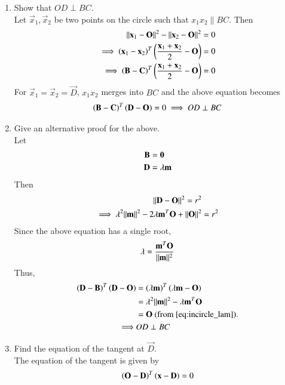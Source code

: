 \begin{enumerate}[label=\arabic*.,ref=\thesubsection.\theenumi]
\item Show that $OD \perp BC$.
%
\\
\solution Let $\vec{x}_1,\vec{x}_2$ be two points on the circle such that 
$x_1x_2 \parallel BC$. Then
%
\begin{align}
\lVert\mathbf{x}_1-\mathbf{O}\rVert^2- 
\lVert\mathbf{x}_2-\mathbf{O}\rVert^2 &= 0 
\\
\implies 
\left(\mathbf{x}_1-\mathbf{x}_2\right)^T\left(\frac{\mathbf{x}_1+\mathbf{x}_2}{2}-\mathbf{O}\right) &= 
0 
\\
\implies 
\left(\mathbf{B}-\mathbf{C}\right)^T\left(\frac{\mathbf{x}_1+\mathbf{x}_2}{2}-\mathbf{O}\right) &= 
0 
\end{align}
%
For $\vec{x}_1=\vec{x}_2=\vec{D}$, $x_1x_2$ merges into $BC$ and the above 
equation becomes 
%
\begin{align}
\left(\mathbf{B}-\mathbf{C}\right)^T\left(\mathbf{D}-\mathbf{O}\right) = 
0 
\implies OD \perp BC
\end{align}
%
\item Give an alternative proof for the above.
\\
\solution Let 
\begin{align}
\mathbf{B} & = \mathbf{0}
\\
\mathbf{D} &= \lambda \mathbf{m}
\end{align}
Then
\begin{align}
\lVert\mathbf{D} - \mathbf{O}\rVert^2 = r^2 &
\\
\implies \lambda^2\lVert\mathbf{m}\rVert^2 - 2\lambda\mathbf{m}^T\mathbf{O} + \lVert\mathbf{O}\rVert^2 &= r^2 
\end{align}
Since the above equation has a single root,
\begin{align}
\lambda = \frac{\mathbf{m}^T\mathbf{O}}{\lVert\mathbf{m}\rVert^2}
\label{eq:incircle_lam}
\end{align}
%
Thus, 
\begin{align}
\left(\mathbf{D} - \mathbf{B}\right)^T\left(\mathbf{D} - \mathbf{O}\right)
&= \left(\lambda\mathbf{m}\right)^T
\left(\lambda\mathbf{m}-\mathbf{O}\right)
\\
&=\lambda^2\lVert\mathbf{m}\rVert^2-\lambda\mathbf{m}^T\mathbf{O}
\\
&= \mathbf{O} \text{ (from \ref{eq:incircle_lam})}.
\\
\implies & OD \perp BC
\end{align}
\item Find the equation of the tangent at $\vec{D}$.
\\
\solution The equation of the tangent is given by 
\begin{align}
\left(\mathbf{O}-\mathbf{D}\right)^T\left(\mathbf{x}-\mathbf{D}\right)=0
\end{align}
\end{enumerate}


